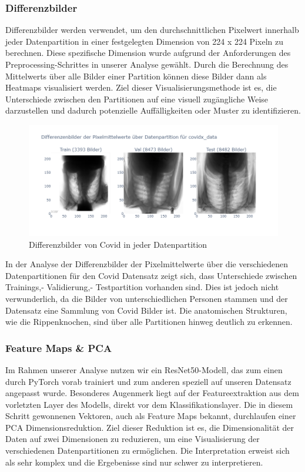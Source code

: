 \subsubsection{Differenzbilder} \label{chap:Differenzenbilder-TestProblemEda2-covidx}

Differenzbilder werden verwendet, um den durchschnittlichen Pixelwert innerhalb jeder Datenpartition in einer festgelegten Dimension von 224 x 224 Pixeln zu berechnen. Diese spezifische Dimension wurde aufgrund der Anforderungen des Preprocessing-Schrittes in unserer Analyse gewählt. Durch die Berechnung des Mittelwerts über alle Bilder einer Partition können diese Bilder dann als Heatmaps visualisiert werden. Ziel dieser Visualisierungsmethode ist es, die Unterschiede zwischen den Partitionen auf eine visuell zugängliche Weise darzustellen und dadurch potenzielle Auffälligkeiten oder Muster zu identifizieren.

\begin{figure}[ht]
    \centering
    \includegraphics[width=\linewidth, height=5cm]{01-images/03-data/covid-Differenzenbilder-Partition.png}
    \caption{Differenzbilder von Covid in jeder Datenpartition}
    \label{fig:differenzenbilder-datapartition-covid}
\end{figure}

In der Analyse der Differenzbilder der Pixelmittelwerte über die verschiedenen Datenpartitionen für den Covid Datensatz zeigt sich, dass Unterschiede zwischen Trainings,- Validierung,- Testpartition vorhanden sind. Dies ist jedoch nicht verwunderlich, da die Bilder von unterschiedlichen Personen stammen und der Datensatz eine Sammlung von Covid Bilder ist. Die anatomischen Strukturen, wie die Rippenknochen, sind über alle Partitionen hinweg deutlich zu erkennen. 

\subsubsection{Feature Maps \& PCA} \label{chap:FeatureMaps-TestProblemEda3-covidx}

Im Rahmen unserer Analyse nutzen wir ein ResNet50-Modell, das zum einen durch PyTorch vorab trainiert und zum anderen speziell auf unseren Datensatz angepasst wurde. Besonderes Augenmerk liegt auf der Featureextraktion aus dem vorletzten Layer des Modells, direkt vor dem Klassifikationslayer. Die in diesem Schritt gewonnenen Vektoren, auch als Feature Maps bekannt, durchlaufen einer PCA Dimensionsreduktion. Ziel dieser Reduktion ist es, die Dimensionalität der Daten auf zwei Dimensionen zu reduzieren, um eine Visualisierung der verschiedenen Datenpartitionen zu ermöglichen. Die Interpretation erweist sich als sehr komplex und die Ergebenisse sind nur schwer zu interpretieren. 


\newpage